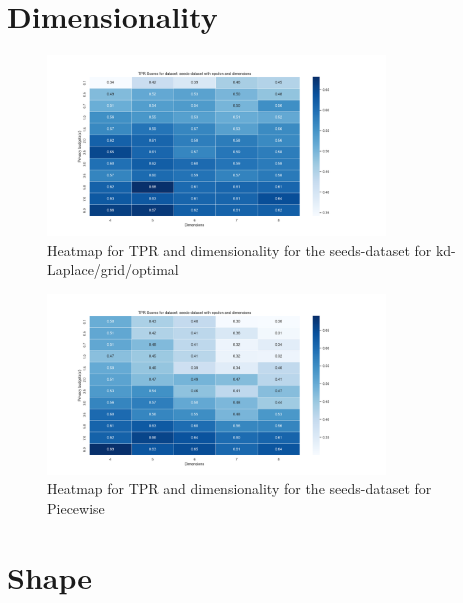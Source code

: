 \section{Dimensionality}
\begin{figure}[H]
    \includegraphics[width=0.8\textwidth]{Results/RQ3/seeds-dataset/security_dimensions_heatmap_nd-laplace-optimal-truncated.png}
    \caption{Heatmap for TPR and dimensionality for the seeds-dataset for kd-Laplace/grid/optimal}
    \label{fig:security_dimensions_heatmap_seeds-dataset_comparison_nd-laplace-optimal-truncated}
\end{figure}
\begin{figure}[H]
    \includegraphics[width=0.8\textwidth]{Results/RQ3/seeds-dataset/security_dimensions_heatmap_nd-piecewise.png}
    \caption{Heatmap for TPR and dimensionality for the seeds-dataset for Piecewise}
    \label{fig:security_dimensions_heatmap_seeds-dataset_comparison_nd-piecewise}
\end{figure}
\newpage

\section{Shape}